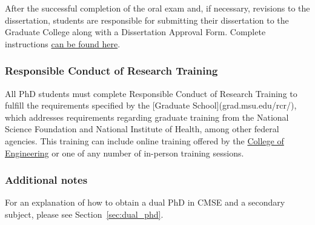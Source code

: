 \noindent
After the successful completion of the oral exam and, if necessary,
revisions to the dissertation, students are responsible for submitting
their dissertation to the Graduate College along with a Dissertation
Approval Form.  Complete
instructions \href{https://grad.msu.edu/etd}{can be found here}.


\vspace{3mm}
\subsubsection{Responsible Conduct of Research Training}

All PhD students must complete Responsible Conduct of Research
Training to fulfill the requirements specified by the [Graduate
School](grad.msu.edu/rcr/), which addresses requirements regarding
graduate training from the National Science Foundation and National
Institute of Health, among other federal agencies.  This training can
include online training offered by the \href{https://www.egr.msu.edu/secureresearchcourses/}{College of
Engineering}  or one of
any number of in-person training sessions.

\vspace{3mm}
\subsubsection{Additional notes}

For an explanation of how to obtain a dual PhD in CMSE and a secondary
subject, please see Section~\ref{sec:dual_phd}.




